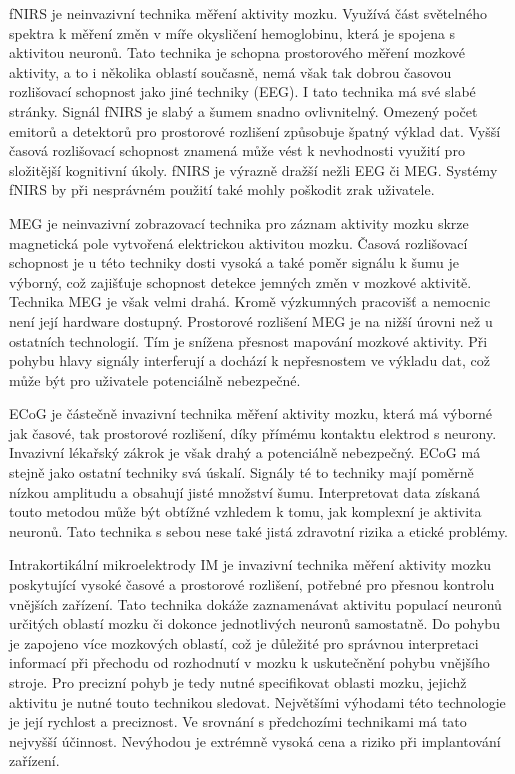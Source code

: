\documentclass[a4paper,10pt]{article}
\theoremstyle{definition}
\begin{document}
fNIRS je neinvazivní technika měření aktivity mozku. Využívá část světelného spektra k měření změn v míře okysličení hemoglobinu, která je spojena s aktivitou neuronů. Tato technika je schopna prostorového měření mozkové aktivity, a to i několika oblastí současně, nemá však tak dobrou časovou rozlišovací schopnost jako jiné techniky (EEG). I tato technika má své slabé stránky. Signál fNIRS je slabý a šumem snadno ovlivnitelný. Omezený počet emitorů a detektorů pro prostorové rozlišení způsobuje špatný výklad dat. Vyšší časová rozlišovací schopnost znamená může vést k nevhodnosti využití pro složitější kognitivní úkoly. fNIRS je výrazně dražší nežli EEG či MEG. Systémy fNIRS by při nesprávném použití také mohly poškodit zrak uživatele.

MEG je neinvazivní zobrazovací technika pro záznam aktivity mozku skrze magnetická pole vytvořená elektrickou aktivitou mozku. Časová rozlišovací schopnost je u této techniky dosti vysoká a také poměr signálu k šumu je výborný, což zajišťuje schopnost detekce jemných změn v mozkové aktivitě. Technika MEG je však velmi drahá. Kromě výzkumných pracovišť a nemocnic není její hardware dostupný. Prostorové rozlišení MEG je na nižší úrovni než u ostatních technologií. Tím je snížena přesnost mapování mozkové aktivity. Při pohybu hlavy signály interferují a dochází k nepřesnostem ve výkladu dat, což může být pro uživatele potenciálně nebezpečné.

ECoG je částečně invazivní technika měření aktivity mozku, která má výborné jak časové, tak prostorové rozlišení, díky přímému kontaktu elektrod s neurony. Invazivní lékařský zákrok je však drahý a potenciálně nebezpečný. ECoG má stejně jako ostatní techniky svá úskalí. Signály té to techniky mají poměrně nízkou amplitudu a obsahují jisté množství šumu. Interpretovat data získaná touto metodou může být obtížné vzhledem k tomu, jak komplexní je aktivita neuronů. Tato technika s sebou nese také jistá zdravotní rizika a etické problémy.

Intrakortikální mikroelektrody IM je invazivní technika měření aktivity mozku poskytující vysoké časové a prostorové rozlišení, potřebné pro přesnou kontrolu vnějších zařízení. Tato technika dokáže zaznamenávat aktivitu populací neuronů určitých oblastí mozku či dokonce jednotlivých neuronů samostatně. Do pohybu je zapojeno více mozkových oblastí, což je důležité pro správnou interpretaci informací při přechodu od rozhodnutí v mozku k uskutečnění pohybu vnějšího stroje. Pro precizní pohyb je tedy nutné specifikovat oblasti mozku, jejichž aktivitu je nutné touto technikou sledovat. Největšími výhodami této technologie je její rychlost a preciznost. Ve srovnání s předchozími technikami má tato nejvyšší účinnost. Nevýhodou je extrémně vysoká cena a riziko při implantování zařízení.
\end{document}
